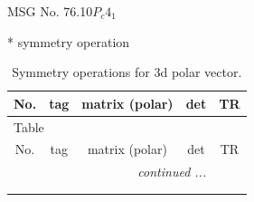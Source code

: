 \documentclass[fleqn,8pt]{jsarticle}
\begin{document}
\setcounter{MaxMatrixCols}{32}

\renewcommand{\tablename}{Table~}
\renewcommand{\figurename}{Figure~}
\begin{center}
\LARGE
MSG No. 76.10\quad$P_{c}4_{1}$
\end{center}
* symmetry operation
\renewcommand{\arraystretch}{1.3}
\begin{longtable}{ccccc}
\caption{Symmetry operations for 3d polar vector.}
 \\
 \hline \hline
No. & tag & matrix (polar) & det & TR \\ \hline \endfirsthead

\multicolumn{4}{l}{\tablename\ \thetable{}} \\
 \hline \hline
No. & tag & matrix (polar) & det & TR \\ \hline \endhead

 \hline \hline
\multicolumn{4}{r}{\footnotesize\it continued ...} \\ \endfoot

 \hline \hline
\multicolumn{4}{r}{} \\ \endlastfoot


\end{longtable}
\end{document}
